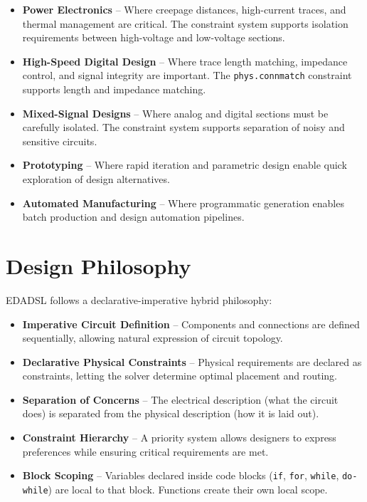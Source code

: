 \begin{itemize}
\item \textbf{Power Electronics} -- Where creepage distances, high-current traces, and thermal management are critical. The constraint system supports isolation requirements between high-voltage and low-voltage sections.

\item \textbf{High-Speed Digital Design} -- Where trace length matching, impedance control, and signal integrity are important. The \texttt{phys.connmatch} constraint supports length and impedance matching.

\item \textbf{Mixed-Signal Designs} -- Where analog and digital sections must be carefully isolated. The constraint system supports separation of noisy and sensitive circuits.

\item \textbf{Prototyping} -- Where rapid iteration and parametric design enable quick exploration of design alternatives.

\item \textbf{Automated Manufacturing} -- Where programmatic generation enables batch production and design automation pipelines.
\end{itemize}

\section{Design Philosophy}
EDADSL follows a declarative-imperative hybrid philosophy:

\begin{itemize}
\item \textbf{Imperative Circuit Definition} -- Components and connections are defined sequentially, allowing natural expression of circuit topology.

\item \textbf{Declarative Physical Constraints} -- Physical requirements are declared as constraints, letting the solver determine optimal placement and routing.

\item \textbf{Separation of Concerns} -- The electrical description (what the circuit does) is separated from the physical description (how it is laid out).

\item \textbf{Constraint Hierarchy} -- A priority system allows designers to express preferences while ensuring critical requirements are met.

\item \textbf{Block Scoping} -- Variables declared inside code blocks (\texttt{if}, \texttt{for}, \texttt{while}, \texttt{do-while}) are local to that block. Functions create their own local scope.
\end{itemize}

